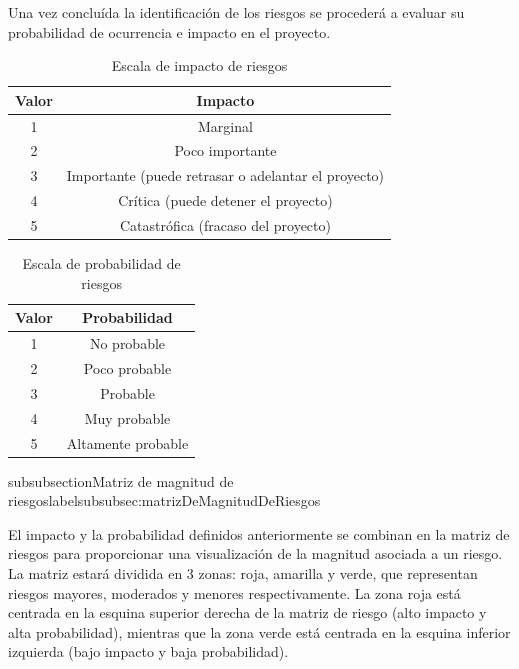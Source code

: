 Una vez concluída la identificación de los riesgos se procederá a evaluar su probabilidad de ocurrencia e impacto en el proyecto.


\begin{table}[H]
    \centering
    \begin{tabular}{c c}
    \hline
    \textbf{Valor} & \textbf{Impacto} \\ \hline
    1 & Marginal \\ \hline
    2 & Poco importante \\ \hline
    3 & Importante (puede retrasar o adelantar el proyecto) \\ \hline
    4 & Crítica (puede detener el proyecto) \\ \hline
    5 & Catastrófica (fracaso del proyecto) \\ \hline
    \end{tabular}
    \caption{Escala de impacto de riesgos}
    \label{tab:escalaDeImpactoDeRiesgos}
\end{table}


\begin{table}[H]
    \centering
    \begin{tabular}{c c}
    \hline
    \textbf{Valor} & \textbf{Probabilidad} \\ \hline
    1 & No probable \\ \hline
    2 & Poco probable \\ \hline
    3 & Probable \\ \hline
    4 & Muy probable \\ \hline
    5 & Altamente probable \\ \hline
    \end{tabular}
    \caption{Escala de probabilidad de riesgos}
    \label{tab:escalaDeProbabilidadDeRiesgos}
\end{table}

subsubsection{Matriz de magnitud de riesgos}label{subsubsec:matrizDeMagnitudDeRiesgos}

El impacto y la probabilidad definidos anteriormente se combinan en la matriz de riesgos para proporcionar una visualización de 
la magnitud asociada a un riesgo.
La matriz estará dividida en 3 zonas: roja, amarilla y verde, que representan riesgos mayores, moderados y menores respectivamente. 
La zona roja está centrada en la esquina superior derecha de la matriz de riesgo (alto impacto y alta probabilidad), mientras que la 
zona verde está centrada en la esquina inferior izquierda (bajo impacto y baja probabilidad). 

